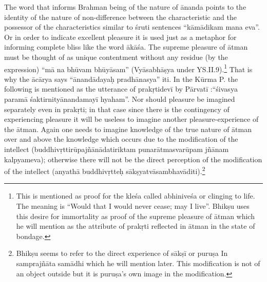 The word that informs Brahman being of the nature of ānanda points to the identity of the nature of non-difference  between the characteristic and the possessor of the characteristics similar to śruti sentences “kāmādikam mana eva”. Or in order to indicate excellent pleasure it is used just as a metaphor for informing complete bliss like the word ākāśa. The supreme pleasure of ātman must be thought of as unique contentment without any residue (by the expression) “mā na bhūvam bhūyāsam” (Vyāsabhāṣya under YS.II.9).\footnote{This is mentioned as proof for the kleśa called abhiniveśa or clinging to life. The meaning is “Would that I would never cease; may I live”. Bhikṣu uses this desire for immortality as proof of the supreme pleasure of ātman which he will mention as the attribute of prakṛti reflected in ātman in the state of bondage.} That is why the ācārya says “ānandādayaḥ pradhānasya” iti. In the Kūrma P. the following is mentioned as the utterance of prakṛtidevī by Pārvatī :“śivasya paramā śaktirnityānandamayī hyaham”. Nor should pleasure be imagined separately even in prakṛti; in that case since there is the contingency of experiencing pleasure it will be useless to imagine another pleasure-experience of the ātman. Again one needs to imagine knowledge of the true nature of ātman over and above the knowledge which occurs due to the modification of the intellect (buddhivṛttirūpajñānādatiriktam punarātmasvarūpam jñānam kalpyameva); otherwise there will not be the direct perception of the modification of the intellect (anyathā buddhivṛtteḥ sākṣyatvāsambhavāditi).\footnote{Bhikṣu seems to refer to the direct experience of sākṣī or puruṣa In samprajñāta samādhi which he will mention later. This modification is not of an object outside but it is puruṣa’s own image in the modification.} 



